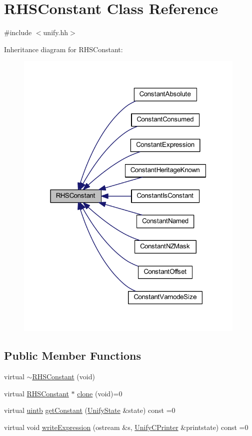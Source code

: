 \hypertarget{class_r_h_s_constant}{}\section{R\+H\+S\+Constant Class Reference}
\label{class_r_h_s_constant}


{\ttfamily \#include $<$unify.\+hh$>$}



Inheritance diagram for R\+H\+S\+Constant\+:
\nopagebreak
\begin{figure}[H]
\begin{center}
\leavevmode
\includegraphics[width=313pt]{class_r_h_s_constant__inherit__graph}
\end{center}
\end{figure}
\subsection*{Public Member Functions}
\begin{DoxyCompactItemize}
\item 
virtual \mbox{\hyperlink{class_r_h_s_constant_a8e18f575d951ea4cfe571920be95eae1}{$\sim$\+R\+H\+S\+Constant}} (void)
\item 
virtual \mbox{\hyperlink{class_r_h_s_constant}{R\+H\+S\+Constant}} $\ast$ \mbox{\hyperlink{class_r_h_s_constant_a3e43335a89351a453932a8c0544d5722}{clone}} (void)=0
\item 
virtual \mbox{\hyperlink{types_8h_a2db313c5d32a12b01d26ac9b3bca178f}{uintb}} \mbox{\hyperlink{class_r_h_s_constant_a941b5d2898cbce985a3ef9c5db6fa458}{get\+Constant}} (\mbox{\hyperlink{class_unify_state}{Unify\+State}} \&state) const =0
\item 
virtual void \mbox{\hyperlink{class_r_h_s_constant_a79e03c6da5320e24873a4fee25f91411}{write\+Expression}} (ostream \&s, \mbox{\hyperlink{class_unify_c_printer}{Unify\+C\+Printer}} \&printstate) const =0
\end{DoxyCompactItemize}


